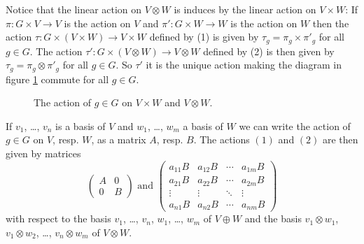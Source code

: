 \begin{expls}
 Notice that the linear action on $V \otimes W$ is induces by the linear action on $V \times W$: If $\pi \colon G \times V \to V$ is the action on $V$ and $\pi' \colon G \times W \to W$ is the action on $W$ then the action $\tau \colon G \times (V \times W) \to V \times W$ defined by (1) is given by $\tau_g = \pi_g \times \pi'_g$ for all $g \in G$. The action $\tau' \colon G \times (V \otimes W) \to V \otimes W$ defined by (2) is then given by $\tau_g = \pi_g \otimes \pi'_g$ for all $g \in G$. So $\tau'$ it is the unique action making the diagram in figure \ref{fig: action on product and tensor} commute for all $g \in G$.
 \begin{figure}\label{fig: action on product and tensor}\centering
  \caption{The action of $g \in G$ on $V \times W$ and $V \otimes W$.}
 \end{figure}
 
 If $v_1$, \dots, $v_n$ is a basis of $V$ and $w_1$, \dots, $w_m$ a basis of $W$ we can write the action of $g \in G$ on $V$, resp. $W$, as a matrix $A$, resp. $B$. The actions $(1)$ and $(2)$ are then given by matrices
 \[
  \begin{pmatrix}
   A & 0 \\
   0 & B
  \end{pmatrix}
  \text{ and }
  \begin{pmatrix}
   a_{11} B & a_{12} B & \cdots & a_{1m} B \\
   a_{21} B & a_{22} B & \cdots & a_{2m} B \\
    \vdots  &  \vdots  & \ddots &  \vdots  \\
   a_{n1} B & a_{n2} B & \cdots & a_{nm} B
  \end{pmatrix}
\]
with respect to the basis $v_1$, \dots, $v_n$, $w_1$, \dots, $w_m$ of $V \oplus W$ and the basis $v_1 \otimes w_1$, $v_1 \otimes w_2$, \dots, $v_n \otimes w_m$ of $V \otimes W$.
\end{expls}


